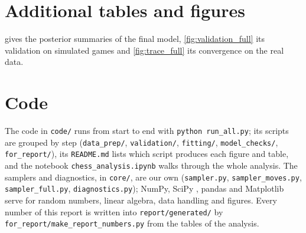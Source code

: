 \documentclass[12pt]{article}
\begin{document}
\section{Additional tables and figures}\label{app:figures}

\begin{table}[h]
  \centering
  \caption{Posterior means and 90\% intervals of the final model. Win probabilities are for two players of equal rating and average strength for their rating.}
  \label{tab:final}
  \small
  
\end{table}

 gives the posterior summaries of the final model, \cref{fig:validation_full} its validation on simulated games and \cref{fig:trace_full} its convergence on the real data.




\section{Code}\label{app:code}

{\sloppy The code in \texttt{code/} runs from start to end with \texttt{python run\_all.py}; its scripts are grouped by step (\texttt{data\_prep/}, \texttt{validation/}, \texttt{fitting/}, \texttt{model\_checks/}, \texttt{for\_report/}), its \texttt{README.md} lists which script produces each figure and table, and the notebook \texttt{chess\_analysis.ipynb} walks through the whole analysis. The samplers and diagnostics, in \texttt{core/}, are our own (\texttt{sampler.py}, \texttt{sampler\_moves.py}, \texttt{sampler\_full.py}, \texttt{diagnostics.py}); NumPy, SciPy \citep{virtanen2020scipy}, pandas and Matplotlib \citep{hunter2007matplotlib} serve for random numbers, linear algebra, data handling and figures. Every number of this report is written into \texttt{report/generated/} by \texttt{for\_report/make\_report\_numbers.py} from the tables of the analysis.\par}
\end{document}
